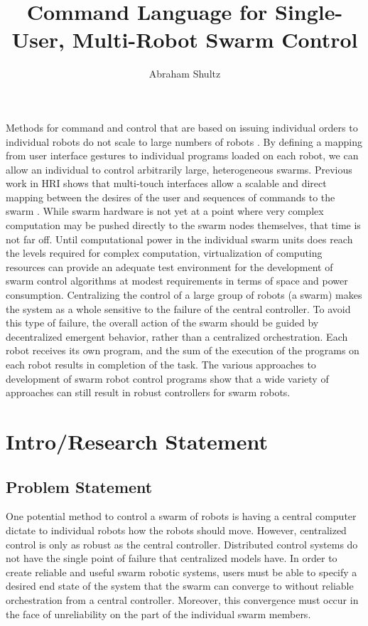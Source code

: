 \documentclass[]{article}
\title{Command Language for Single-User, Multi-Robot Swarm Control}
\author{Abraham Shultz}
\begin{document}
\maketitle

\begin{abstract}

\end{abstract}

Methods for command and control that are based on issuing individual orders to individual robots do not scale to large numbers of robots \cite{WangSearchScale}.
By defining a mapping from user interface gestures to individual programs loaded on each robot, we can allow an individual to control arbitrarily large, heterogeneous swarms.
Previous work in HRI shows that multi-touch interfaces allow a scalable and direct mapping between the desires of the user and sequences of commands to the swarm \cite{micire2009multi}. 
While swarm hardware is not yet at a point where very complex computation may be pushed directly to the swarm nodes themselves, that time is not far off. 
Until computational power in the individual swarm units does reach the levels required for complex computation, virtualization of computing resources can provide an adequate test environment for the development of swarm control algorithms at modest requirements in terms of space and power consumption. 
Centralizing the control of a large group of robots (a swarm) makes the system as a whole sensitive to the failure of the central controller. 
To avoid this type of failure, the overall action of the swarm should be guided by decentralized emergent behavior, rather than a centralized orchestration. 
Each robot receives its own program, and the sum of the execution of the programs on each robot results in completion of the task.
The various approaches to development of swarm robot control programs show that a wide variety of approaches can still result in robust controllers for swarm robots. 

\section{Intro/Research Statement}

\subsection{Problem Statement}

One potential method to control a swarm of robots is having a central computer dictate to individual robots how the robots should move.
However, centralized control is only as robust as the central controller. 
Distributed control systems do not have the single point of failure that centralized models have. 
In order to create reliable and useful swarm robotic systems, users must be able to specify a desired end state of the system that the swarm can converge to without reliable orchestration from a central controller. 
Moreover, this convergence must occur in the face of unreliability on the part of the individual swarm members. 
\end{document}

